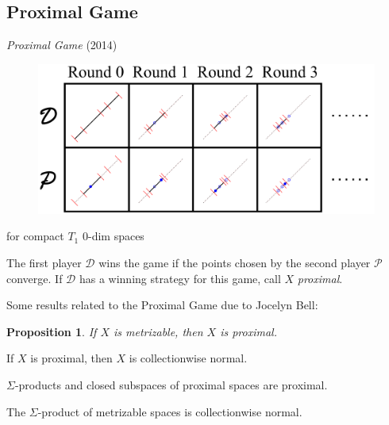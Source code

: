 \documentclass{beamer}
\newtheorem{proposition}[theorem]{Proposition}
\theoremstyle{definition}
\newcommand{\<}{\langle}
\renewcommand{\>}{\rangle}
\newcommand{\pl}[1]{\mathscr{#1}}
\newcommand{\term}{\textit}
\begin{document}




\subsection{Proximal Game}

\begin{frame}
  \term{Proximal Game} (2014)
  \cite{MR3239205}

  \vspacing

  \begin{figure}
    \includegraphics[width=0.8\linewidth]{proximalGame.pdf}
  \end{figure}
  {\tiny for compact $T_1$ $0$-dim spaces}

  \vpause

  The first player $\pl D$ wins the game if the points chosen by the
  second player $\pl P$ converge. If $\pl D$ has a winning
  strategy for this game, call $X$ \term{proximal}.
\end{frame}

\begin{frame}
  Some results related to the Proximal Game due to Jocelyn Bell:

  \begin{proposition}
    If $X$ is metrizable, then $X$ is proximal.
  \end{proposition}

  \begin{theorem}
    If $X$ is proximal, then $X$ is collectionwise normal.
  \end{theorem}

  \begin{theorem}
    $\Sigma$-products and closed subspaces of proximal spaces are proximal.
  \end{theorem}

  \pause

  \begin{corollary}
    The $\Sigma$-product of metrizable spaces is collectionwise normal.
    \cite{MR0461410} \cite{MR716576}
  \end{corollary}
\end{frame}
\end{document}

